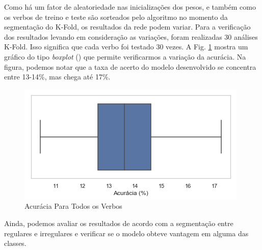 Como há um fator de aleatoriedade nas inicializações dos pesos, e também como os verbos de treino e teste são sorteados pelo algoritmo no momento da segmentação do K-Fold, os resultados da rede podem variar. Para a verificação dos resultados levando em consideração as variações, foram realizadas 30 análises K-Fold. Isso significa que cada verbo foi testado 30 vezes. A Fig. \ref{fig:acc} mostra um gráfico do tipo \textit{boxplot} (\cite{2004:bussab}) que permite verificarmos a variação da acurácia. Na figura, podemos notar que a taxa de acerto do modelo desenvolvido se concentra entre 13-14\%, mas chega até 17\%.

\begin{figure}[H]
  \centering
  \includegraphics[width=0.6\linewidth]{img/mean_accuracy.png}
  \caption{Acurácia Para Todos os Verbos}
  \label{fig:acc}
\end{figure}

Ainda, podemos avaliar os resultados de acordo com a segmentação entre regulares e irregulares e verificar se o modelo obteve vantagem em alguma das classes. 

